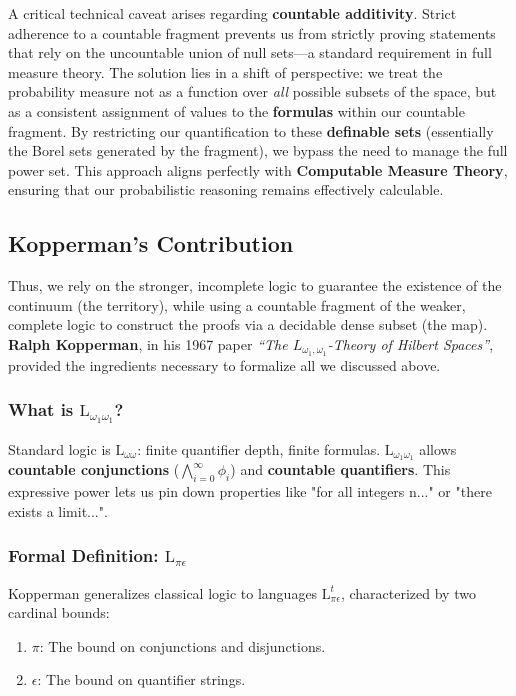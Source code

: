 \documentclass{stex}
\begin{document}
A critical technical caveat arises regarding \textbf{countable additivity}. Strict adherence to a countable fragment prevents us from strictly proving statements that rely on the uncountable union of null sets---a standard requirement in full measure theory. The solution lies in a shift of perspective: we treat the probability measure not as a function over \textit{all} possible subsets of the space, but as a consistent assignment of values to the \textbf{formulas} within our countable fragment. By restricting our quantification to these \textbf{definable sets} (essentially the Borel sets generated by the fragment), we bypass the need to manage the full power set. This approach aligns perfectly with \textbf{Computable Measure Theory}, ensuring that our probabilistic reasoning remains effectively calculable.

\subsection{Kopperman's Contribution}

Thus, we rely on the stronger, incomplete logic to guarantee the existence of the continuum (the territory), while using a countable fragment of the weaker, complete logic to construct the proofs via a decidable dense subset (the map). \textbf{Ralph Kopperman}, in his 1967 paper \textit{``The $L_{\omega_1, \omega_1}$-Theory of Hilbert Spaces''}, provided the ingredients necessary to formalize all we discussed above.

\subsubsection{What is $\mathrm{L}_{\omega_1 \omega_1}$?}
Standard logic is $\mathrm{L}_{\omega \omega}$: finite quantifier depth, finite formulas.
$\mathrm{L}_{\omega_1 \omega_1}$ allows \textbf{countable conjunctions} ($\bigwedge_{i=0}^\infty \phi_i$) and \textbf{countable quantifiers}. This expressive power lets us pin down properties like "for all integers n..." or "there exists a limit...".

\subsubsection{Formal Definition: $\mathrm{L}_{\pi \epsilon}$}

Kopperman generalizes classical logic to languages $\mathrm{L}_{\pi \epsilon}^t$, characterized by two cardinal bounds:
\begin{enumerate}
    \item $\pi$: The bound on conjunctions and disjunctions.
    \item $\epsilon$: The bound on quantifier strings.
\end{enumerate}
\end{document}
